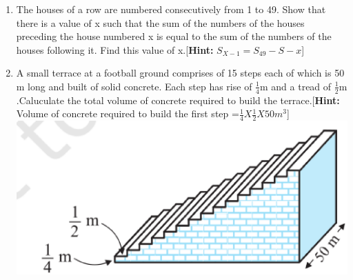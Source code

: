 \begin{enumerate}[label=\arabic*.,ref=\thesubsection.\theenumi]
\item The houses of a row are numbered consecutively from 1 to 49. Show that there is a value of x such that the sum of the numbers of the houses preceding the house numbered x is equal to the sum of the numbers of the houses following it. Find this value of x.[\textbf{Hint:} $S_{X-1} = S_49 -S-x$]
\item A small terrace at a football ground comprises of 15 steps each of which is 50 m long and built of solid concrete. Each step has rise of $\frac{1}{4}$m and a tread of $\frac{1}{2}$m .Caluculate the total volume of concrete required to build the terrace.[\textbf{Hint:} Volume of concrete required to build the first step =$\frac{1}{4}X \frac{1}{2}X 50m^3$]\\
\includegraphics[width=\columnwidth]{./figs/fig5.eps}  
\end{enumerate}
%
    
